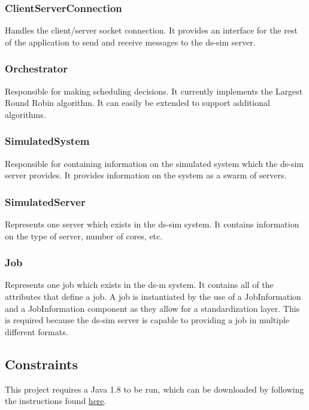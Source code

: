 \documentclass[a4paper]{article}
\begin{document}
\subsubsection*{ClientServerConnection}
Handles the client/server socket connection. It provides an interface for the rest of the application to send and receive messages to the ds-sim server.

\subsubsection*{Orchestrator}
Responsible for making scheduling decisions. It currently implements the Largest Round Robin algorithm. It can easily be extended to support additional algorithms.

\subsubsection*{SimulatedSystem}
Responsible for containing information on the simulated system which the ds-sim server provides. It provides information on the system as a swarm of servers.

\subsubsection*{SimulatedServer}
Represents one server which exists in the ds-sim system. It contains information on the type of server, number of cores, etc.

\subsubsection*{Job}
Represents one job which exists in the ds-m system. It contains all of the attributes that define a job. A job is instantiated by the use of a JobInformation and a JobInformation component as they allow for a standardization layer. This is required because the ds-sim server is capable to providing a job in multiple different formats.

\subsection{Constraints}
This project requires a Java 1.8 to be run, which can be downloaded by following the instructions found
\href{https://docs.datastax.com/en/jdk-install/doc/jdk-install/installOpenJdkDeb.html}{here}.
\end{document}
